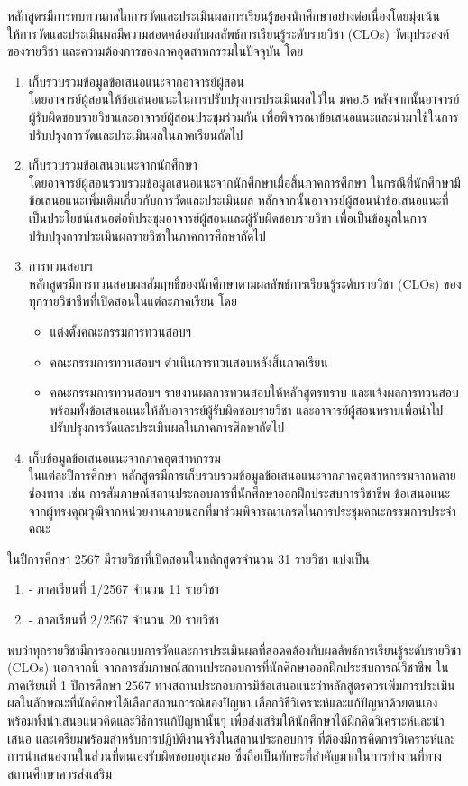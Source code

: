 หลักสูตรมีการทบทวนกลไกการวัดและประเมินผลการเรียนรู้ของนักศึกษาอย่างต่อเนื่องโดยมุ่งเน้นให้การวัดและประเมินผลมีความสอดคล้องกับผลลัพธ์การเรียนรู้ระดับรายวิชา (CLOs) วัตถุประสงค์ของรายวิชา และความต้องการของภาคอุตสาหกรรมในปัจจุบัน โดย 
\begin{enumerate}
	\item เก็บรวบรวมข้อมูลข้อเสนอแนะจากอาจารย์ผู้สอน \\ โดยอาจารย์ผู้สอนให้ข้อเสนอแนะในการปรับปรุงการประเมินผลไว้ใน มคอ.5 หลังจากนั้นอาจารย์ผู้รับผิดชอบรายวิชาและอาจารย์ผู้สอนประชุมร่วมกัน
	เพื่อพิจารณาข้อเสนอแนะและนำมาใช้ในการปรับปรุงการวัดและประเมินผลในภาคเรียนถัดไป
	\item เก็บรวบรวมข้อเสนอแนะจากนักศึกษา\\ โดยอาจารย์ผู้สอนรวบรวมข้อมูลเสนอแนะจากนักศึกษาเมื่อสิ้นภาคการศึกษา ในกรณีที่นักศึกษามีข้อเสนอแนะเพิ่มเติมเกี่ยวกับการวัดและประเมินผล หลักจากนั้นอาจารย์ผู้สอนนำข้อเสนอแนะที่เป็นประโยชน์เสนอต่อที่ประชุมอาจารย์ผู้สอนและผู้รับผิดชอบรายวิชา เพื่อเป็นข้อมูลในการปรับปรุงการประเมินผลรายวิชาในภาคการศึกษาถัดไป
	\item การทวนสอบฯ\\
	หลักสูตรมีการทวนสอบผลสัมฤทธิ์ของนักศึกษาตามผลลัพธ์การเรียนรู้ระดับรายวิชา (CLOs) ของทุกรายวิชาชีพที่เปิดสอนในแต่ละภาคเรียน โดย
	\begin{itemize}
		\item แต่งตั้งคณะกรรมการทวนสอบฯ
		\item คณะกรรมการทวนสอบฯ ดำเนินการทวนสอบหลังสิ้นภาคเรียน
		\item คณะกรรมการทวนสอบฯ รายงานผลการทวนสอบให้หลักสูตรทราบ และแจ้งผลการทวนสอบพร้อมทั้งข้อเสนอแนะให้กับอาจารย์ผู้รับผิดชอบรายวิชา และอาจารย์ผู้สอนทราบเพื่อนำไปปรับปรุงการวัดและประเมินผลในภาคการศึกษาถัดไป
	\end{itemize}
	\item เก็บข้อมูลข้อเสนอแนะจากภาคอุตสาหกรรม\\
	ในแต่ละปีการศึกษา หลักสูตรมีการเก็บรวบรวมข้อมูลข้อเสนอแนะจากภาคอุตสาหกรรมจากหลายช่องทาง เช่น การสัมภาษณ์สถานประกอบการที่นักศึกษาออกฝึกประสบการวิชาชีพ ข้อเสนอแนะจากผู้ทรงคุณวุฒิจากหน่วยงานภายนอกที่มาร่วมพิจารณาเกรดในการประชุมคณะกรรมการประจำคณะ
\end{enumerate}

ในปีการศึกษา 2567  มีรายวิชาที่เปิดสอนในหลักสูตรจำนวน 31 รายวิชา แบ่งเป็น
\begin{enumerate}
	\item[] - ภาคเรียนที่ 1/2567 จำนวน 11 รายวิชา
	\item[] - ภาคเรียนที่ 2/2567 จำนวน 20 รายวิชา
\end{enumerate}
พบว่าทุกรายวิชามีการออกแบบการวัดและการประเมินผลที่สอดคล้องกับผลลัพธ์การเรียนรู้ระดับรายวิชา (CLOs) นอกจากนี้ จากการสัมภาษณ์สถานประกอบการที่นักศึกษาออกฝึกประสบการณ์วิชาชีพ ในภาคเรียนที่ 1 ปีการศึกษา 2567 ทางสถานประกอบการมีข้อเสนอแนะว่าหลักสูตรควรเพิ่มการประเมินผลในลักษณะที่นักศึกษาได้เลือกสถานการณ์ของปัญหา เลือกวิธีวิเคราะห์และแก้ปัญหาด้วยตนเอง พร้อมทั้งนำเสนอแนวคิดและวิธีการแก้ปัญหานั้นๆ เพื่อส่งเสริมให้นักศึกษาได้ฝึกคิดวิเคราะห์และนำเสนอ และเตรียมพร้อมสำหรับการปฏิบัติงานจริงในสถานประกอบการ ที่ต้องมีการคิดการวิเคราะห์และการนำเสนองานในส่วนที่ตนเองรับผิดชอบอยู่เสมอ ซึ่งถือเป็นทักษะที่สำคัญมากในการทำงานที่ทางสถานศึกษาควรส่งเสริม

